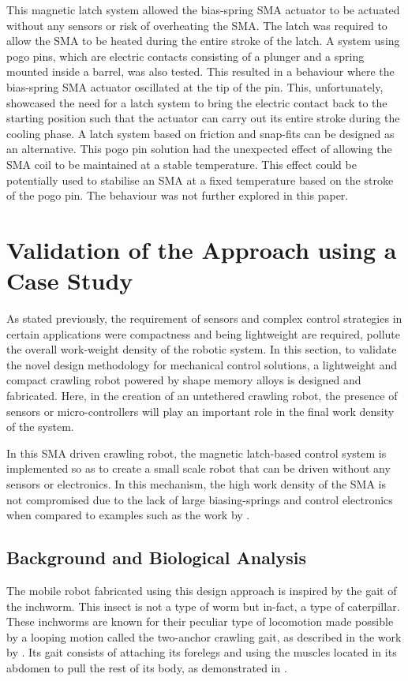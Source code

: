 This magnetic latch system allowed the bias-spring SMA actuator to be actuated without any sensors or risk of overheating the SMA. The latch was required to allow the SMA to be heated during the entire stroke of the latch. A system using pogo pins, which are electric contacts consisting of a plunger and a spring mounted inside a barrel, was also tested. This resulted in a behaviour where the bias-spring SMA actuator oscillated at the tip of the pin. This, unfortunately, showcased the need for a latch system to bring the electric contact back to the starting position such that the actuator can carry out its entire stroke during the cooling phase. A latch system based on friction and snap-fits can be designed as an alternative. This pogo pin solution had the unexpected effect of allowing the SMA coil to be maintained at a stable temperature. This effect could be potentially used to stabilise an SMA at a fixed temperature based on the stroke of the pogo pin. The behaviour was not further explored in this paper.

\section{Validation of the Approach using a Case Study}
As stated previously, the requirement of sensors and complex control strategies in certain applications were compactness and being lightweight are required, pollute the overall work-weight density of the robotic system. In this section, to validate the novel design methodology for mechanical control solutions, a lightweight and compact crawling robot powered by shape memory alloys is designed and fabricated. Here, in the creation of an untethered crawling robot, the presence of sensors or micro-controllers will play an important role in the final work density of the system.

In this SMA driven crawling robot, the magnetic latch-based control system is implemented so as to create a small scale robot that can be driven without any sensors or electronics. In this mechanism, the high work density of the SMA is not compromised due to the lack of large biasing-springs and control electronics when compared to examples such as the work by \todocite.

\subsection{Background and Biological Analysis}\label{subsec:bio-analysis}
The mobile robot fabricated using this design approach is inspired by the gait of the inchworm. This insect is not a type of worm but in-fact, a type of caterpillar. These inchworms are known for their peculiar type of locomotion made possible by a looping motion called the two-anchor crawling gait, as described in the work by \todocite. Its gait consists of attaching its forelegs and using the muscles located in its abdomen to pull the rest of its body, as demonstrated in \todocite.


